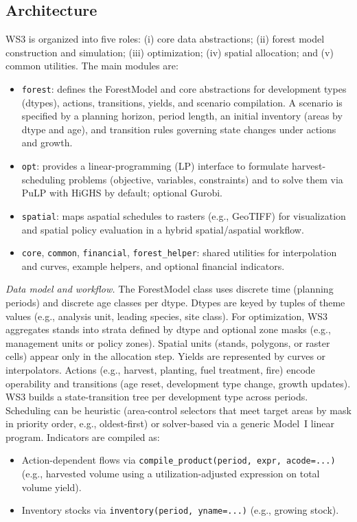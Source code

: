 \documentclass[review]{elsarticle}
\begin{document}
\subsection{Architecture}
WS3 is organized into five roles: (i) core data abstractions; (ii) forest model construction and simulation; (iii) optimization; (iv) spatial allocation; and (v) common utilities. The main modules are:
\begin{itemize}
  \item \texttt{forest}: defines the ForestModel and core abstractions for development types (dtypes), actions, transitions, yields, and scenario compilation. A scenario is specified by a planning horizon, period length, an initial inventory (areas by dtype and age), and transition rules governing state changes under actions and growth.
  \item \texttt{opt}: provides a linear-programming (LP) interface to formulate harvest-scheduling problems (objective, variables, constraints) and to solve them via PuLP with HiGHS by default; optional Gurobi.
  \item \texttt{spatial}: maps aspatial schedules to rasters (e.g., GeoTIFF) for visualization and spatial policy evaluation in a hybrid spatial/aspatial workflow.
  \item \texttt{core}, \texttt{common}, \texttt{financial}, \texttt{forest\_helper}: shared utilities for interpolation and curves, example helpers, and optional financial indicators.
\end{itemize}

\emph{Data model and workflow.} The ForestModel class uses discrete time (planning periods) and discrete age classes per dtype. Dtypes are keyed by tuples of theme values (e.g., analysis unit, leading species, site class). For optimization, WS3 aggregates stands into strata defined by dtype and optional zone masks (e.g., management units or policy zones). Spatial units (stands, polygons, or raster cells) appear only in the allocation step. Yields are represented by curves or interpolators. Actions (e.g., harvest, planting, fuel treatment, fire) encode operability and transitions (age reset, development type change, growth updates). WS3 builds a state-transition tree per development type across periods. Scheduling can be heuristic (area-control selectors that meet target areas by mask in priority order, e.g., oldest-first) or solver-based via a generic Model~I linear program. Indicators are compiled as:
\begin{itemize}
  \item Action-dependent flows via \texttt{compile\_product(period, expr, acode=...)} (e.g., harvested volume using a utilization-adjusted expression on total volume yield).
  \item Inventory stocks via \texttt{inventory(period, yname=...)} (e.g., growing stock).
\end{itemize}
\end{document}
